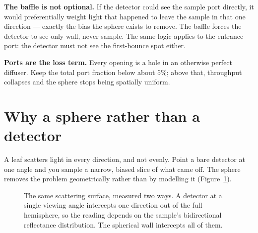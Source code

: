 \documentclass[11pt,letterpaper]{article}
\begin{document}
\textbf{The baffle is not optional.} If the detector could see the sample port directly, it would
preferentially weight light that happened to leave the sample in that one direction --- exactly the
bias the sphere exists to remove. The baffle forces the detector to see only wall, never sample. The
same logic applies to the entrance port: the detector must not see the first-bounce spot either.

\textbf{Ports are the loss term.} Every opening is a hole in an otherwise perfect diffuser. Keep the
total port fraction below about $5\%$; above that, throughput collapses and the sphere stops being
spatially uniform.

\section{Why a sphere rather than a detector}

A leaf scatters light in every direction, and not evenly. Point a bare detector at one angle and you
sample a narrow, biased slice of what came off. The sphere removes the problem geometrically rather
than by modelling it (Figure~\ref{fig:why}).

\begin{figure}[htbp]
\centering
{}
\caption{The same scattering surface, measured two ways. A detector at a single viewing angle
intercepts one direction out of the full hemisphere, so the reading depends on the sample's
bidirectional reflectance distribution. The spherical wall intercepts all of them.}
\label{fig:why}
\end{figure}
\end{document}
